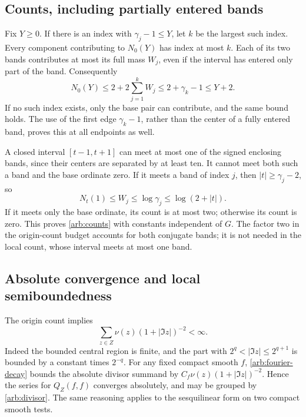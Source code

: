 \subsection{Counts, including partially entered bands}

Fix \(Y\ge0\). If there is an index with
\(\gamma_j-1\le Y\), let \(k\) be the largest such index.
Every component contributing to \(N_0(Y)\) has index at most
\(k\). Each of its two bands contributes at most its full
mass \(W_j\), even if the interval has entered only part of
the band. Consequently
\begin{equation}\label{arb:origin-count}
 N_0(Y)\le2+2\sum_{j=1}^kW_j
       \le2+\gamma_k-1\le Y+2.
\end{equation}
If no such index exists, only the base pair can contribute,
and the same bound holds. The use of the first edge
\(\gamma_k-1\), rather than the center of a fully entered
band, proves this at all endpoints as well.

A closed interval \([t-1,t+1]\) can meet at most one of the
signed enclosing bands, since their centers are separated by
at least ten. It cannot meet both such a band and the base
ordinate zero. If it meets a band of index \(j\), then
\(|t|\ge\gamma_j-2\), so
\begin{equation}\label{arb:local-count}
 N_t(1)\le W_j\le\log\gamma_j\le\log(2+|t|).
\end{equation}
If it meets only the base ordinate, its count is at most two;
otherwise its count is zero. This proves \eqref{arb:counts}
with constants independent of \(G\). The factor two in the
origin-count budget accounts for both conjugate bands; it is
not needed in the local count, whose interval meets at most
one band.

\subsection{Absolute convergence and local semiboundedness}

The origin count implies
\begin{equation}\label{arb:inverse-ordinate-sum}
 \sum_{z\in Z}\nu(z)(1+|\Im z|)^{-2}<\infty.
\end{equation}
Indeed the bounded central region is finite, and the part
with \(2^q<|\Im z|\le2^{q+1}\) is bounded by a constant
times \(2^{-q}\). For any fixed compact smooth \(f\),
\eqref{arb:fourier-decay} bounds the absolute divisor summand
by \(C_f\nu(z)(1+|\Im z|)^{-2}\). Hence the series for
\(Q_Z(f,f)\) converges absolutely, and may be grouped by
\eqref{arb:divisor}. The same reasoning applies to the
sesquilinear form on two compact smooth tests.

